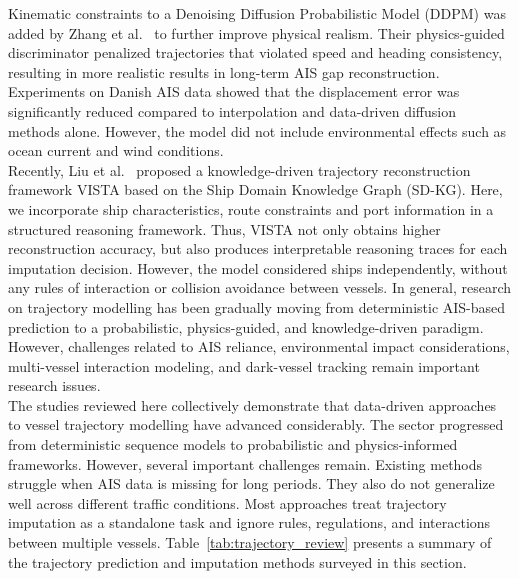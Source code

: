 Kinematic constraints to a Denoising Diffusion Probabilistic Model (DDPM) was added by Zhang et al.~\cite{10.1145/3637528.3672086} to further improve physical realism. Their physics-guided discriminator penalized trajectories that violated speed and heading consistency, resulting in more realistic results in long-term AIS gap reconstruction. Experiments on Danish AIS data showed that the displacement error was significantly reduced compared to interpolation and data-driven diffusion methods alone. However, the model did not include environmental effects such as ocean current and wind conditions.\\
Recently, Liu et al.~\cite{liu2026vista} proposed a knowledge-driven trajectory reconstruction framework VISTA based on the Ship Domain Knowledge Graph (SD-KG). Here, we incorporate ship characteristics, route constraints and port information in a structured reasoning framework. Thus, VISTA not only obtains higher reconstruction accuracy, but also produces interpretable reasoning traces for each imputation decision. However, the model considered ships independently, without any rules of interaction or collision avoidance between vessels. In general, research on trajectory modelling has been gradually moving from deterministic AIS-based prediction to a probabilistic, physics-guided, and knowledge-driven paradigm. However, challenges related to AIS reliance, environmental impact considerations, multi-vessel interaction modeling, and dark-vessel tracking remain important research issues.\\
The studies reviewed here collectively demonstrate that data-driven approaches to vessel trajectory modelling have advanced considerably.  The sector progressed from deterministic sequence models to probabilistic and physics-informed frameworks. However, several important challenges remain. Existing methods struggle when AIS data is missing for long periods. They also do not generalize well across different traffic conditions. Most approaches treat trajectory imputation as a standalone task and ignore rules, regulations, and interactions between multiple vessels. Table~\ref{tab:trajectory_review} presents a summary of the trajectory prediction and imputation methods surveyed in this section.

